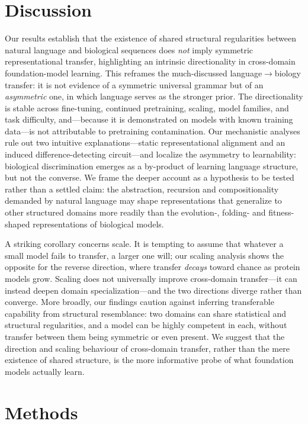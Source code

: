 \documentclass[11pt]{article}
\begin{document}
\section{Discussion}
Our results establish that the existence of shared structural regularities between natural
language and biological sequences does \emph{not} imply symmetric representational transfer,
highlighting an intrinsic directionality in cross-domain foundation-model learning. This reframes
the much-discussed language$\rightarrow$biology transfer: it is not evidence of a symmetric
universal grammar but of an \emph{asymmetric} one, in which language serves as the stronger prior.
The directionality is stable across fine-tuning, continued pretraining, scaling, model families,
and task difficulty, and---because it is demonstrated on models with known training data---is not
attributable to pretraining contamination. Our mechanistic analyses rule out two intuitive
explanations---static representational alignment and an induced difference-detecting circuit---and
localize the asymmetry to learnability: biological discrimination emerges as a by-product of
learning language structure, but not the converse. We frame the deeper account as a hypothesis to
be tested rather than a settled claim: the abstraction, recursion and compositionality demanded by
natural language may shape representations that generalize to other structured domains more readily
than the evolution-, folding- and fitness-shaped representations of biological models.

A striking corollary concerns scale. It is tempting to assume that whatever a small model fails to
transfer, a larger one will; our scaling analysis shows the opposite for the reverse direction, where
transfer \emph{decays} toward chance as protein models grow. Scaling does not universally improve
cross-domain transfer---it can instead deepen domain specialization---and the two directions diverge
rather than converge. More broadly, our findings caution against inferring transferable capability
from structural resemblance: two domains can share statistical and structural regularities, and a
model can be highly competent in each, without transfer between them being symmetric or even
present. We suggest that the direction and scaling behaviour of cross-domain transfer, rather than
the mere existence of shared structure, is the more informative probe of what foundation models
actually learn.

\section*{Methods}
\end{document}
